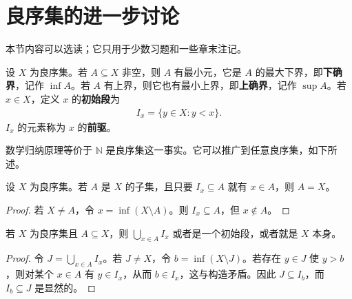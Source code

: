 \documentclass[../../main.tex]{subfiles}%
\begin{document}
\section{良序集的进一步讨论}\label{section:ch00-well-ordered-sets}

本节内容可以选读；它只用于少数习题和一些章末注记。


\begin{definition}[确界、初始段与前驱]\label{definition:ch00-initial-segments}
设 $X$ 为良序集。若 $A\subseteq X$ 非空，则 $A$ 有最小元，它是 $A$ 的最大下界，即\textbf{下确界}，记作 $\inf A$。若 $A$ 有上界，则它也有最小上界，即\textbf{上确界}，记作 $\sup A$。若 $x\in X$，定义 $x$ 的\textbf{初始段}为
\begin{align*}
I_x=\{y\in X:y<x\}.
\end{align*}
$I_x$ 的元素称为 $x$ 的\textbf{前驱}。
\end{definition}


数学归纳原理等价于 $\mathbb{N}$ 是良序集这一事实。它可以推广到任意良序集，如下所述。

\begin{principle}[超限归纳原理]\label{principle:ch00-transfinite-induction}
设 $X$ 为良序集。若 $A$ 是 $X$ 的子集，且只要 $I_x\subseteq A$ 就有 $x\in A$，则 $A=X$。
\end{principle}

\begin{proof}
若 $X\ne A$，令 $x=\inf(X\setminus A)$。则 $I_x\subseteq A$，但 $x\notin A$。
\end{proof}

\begin{proposition}\label{proposition:ch00-union-initial-segments}
若 $X$ 为良序集且 $A\subseteq X$，则 $\bigcup_{x\in A}I_x$ 或者是一个初始段，或者就是 $X$ 本身。
\end{proposition}

\begin{proof}
令 $J=\bigcup_{x\in A}I_x$。若 $J\ne X$，令 $b=\inf(X\setminus J)$。若存在 $y\in J$ 使 $y>b$，则对某个 $x\in A$ 有 $y\in I_x$，从而 $b\in I_x$，这与构造矛盾。因此 $J\subseteq I_b$，而 $I_b\subseteq J$ 是显然的。
\end{proof}
\end{document}

